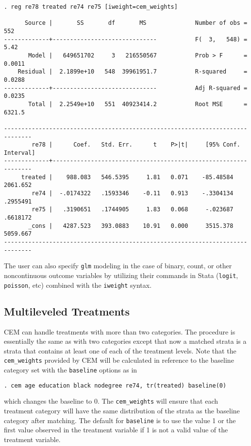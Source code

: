 \documentclass[11pt]{article}
\begin{document}
\begin{verbatim}
. reg re78 treated re74 re75 [iweight=cem_weights]

      Source |       SS       df       MS              Number of obs =     552
-------------+------------------------------           F(  3,   548) =    5.42
       Model |   649651702     3   216550567           Prob > F      =  0.0011
    Residual |  2.1899e+10   548  39961951.7           R-squared     =  0.0288
-------------+------------------------------           Adj R-squared =  0.0235
       Total |  2.2549e+10   551  40923414.2           Root MSE      =  6321.5

------------------------------------------------------------------------------
        re78 |      Coef.   Std. Err.      t    P>|t|     [95% Conf. Interval]
-------------+----------------------------------------------------------------
     treated |    988.083   546.5395     1.81   0.071    -85.48584    2061.652
        re74 |  -.0174322   .1593346    -0.11   0.913    -.3304134    .2955491
        re75 |   .3190651   .1744905     1.83   0.068     -.023687    .6618172
       _cons |   4287.523   393.0883    10.91   0.000     3515.378    5059.667
------------------------------------------------------------------------------

\end{verbatim}


The user can also specify \texttt{glm} modeling in the case of binary,
count, or other noncontinuous outcome variables by utilizing their
commands in Stata (\texttt{logit},\texttt{ poisson}, etc) combined with the
\texttt{iweight} syntax.

\subsection{Multileveled Treatments}

CEM can handle treatments with more than two categories. The procedure is essentially the same as with two categories except that now a matched strata is a strata that contains at least one of each of the treatment levels.  Note that the \texttt{cem\_weights} provided by CEM will be calculated in reference to the baseline category set with the \texttt{baseline} options as in
\begin{verbatim}
. cem age education black nodegree re74, tr(treated) baseline(0)
\end{verbatim}
which changes the baseline to 0. The \texttt{cem\_weights} will ensure that each treatment category will have the same distribution of the strata as the baseline category after matching. The default for \texttt{baseline} is to use the value 1 or the first value observed in the treatment variable if 1 is not a valid value of the treatment variable. 
\end{document}
